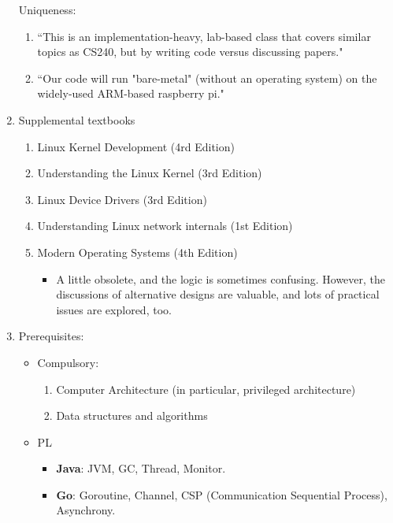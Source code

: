 \documentclass{article}
\begin{document}
\begin{enumerate}
    Uniqueness:
    \begin{enumerate}
        \item ``This is an implementation-heavy, lab-based class that covers similar topics as CS240, but by writing code versus discussing papers."
        \item ``Our code will run "bare-metal" (without an operating system) on the widely-used ARM-based raspberry pi."
    \end{enumerate}
    \item Supplemental textbooks
    \begin{enumerate}
        \item Linux Kernel Development (4rd Edition) \cite{robert2018linux}
        \item Understanding the Linux Kernel (3rd Edition) \cite{bovet2005understanding}
        \item Linux Device Drivers (3rd Edition) \cite{rubini2001linux}
        \item Understanding Linux network internals (1st Edition) \cite{benvenuti2006understanding}
        \item Modern Operating Systems (4th Edition) \cite{tanenbaum2015modern}
        \begin{itemize}
            \item A little obsolete, and the logic is sometimes confusing.
            However, the discussions of alternative designs are valuable, and lots of practical issues are explored, too.
        \end{itemize}
    \end{enumerate}
    \item Prerequisites:
    \begin{itemize}
        \item Compulsory:
        \begin{enumerate}
        \item Computer Architecture (in particular, privileged architecture)
        \item Data structures and algorithms
        \end{enumerate}
        \item PL
        \begin{itemize}
        \item \textbf{Java}: JVM, GC, Thread, Monitor.
        \item \textbf{Go}: Goroutine, Channel, CSP (Communication Sequential Process), Asynchrony.
        \end{itemize}

\end{itemize}
\end{enumerate}
\end{document}
